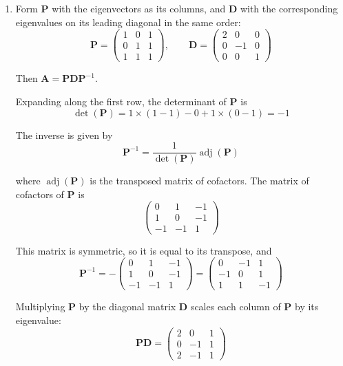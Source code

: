\documentclass[leqno]{article}
\begin{document}
\begin{enumerate}[
  label=\textbf{\arabic*.},
  leftmargin=*,
  topsep=0pt,
  partopsep=0pt,
  parsep=0pt
]
\vspace*{10pt}

\begin{djsSolution}
\begin{enumerate}[label=\textbf{(\alph*)}, start=1]
  \item Form \(\mathbf{P}\) with the eigenvectors as its columns, and \(\mathbf{D}\) with the corresponding eigenvalues on its leading diagonal in the same order:
\[
\mathbf{P}=\begin{pmatrix} 1 & 0 & 1 \\ 0 & 1 & 1 \\ 1 & 1 & 1 \end{pmatrix},\qquad \mathbf{D}=\begin{pmatrix} 2 & 0 & 0 \\ 0 & -1 & 0 \\ 0 & 0 & 1 \end{pmatrix}
\]

Then \(\mathbf{A}=\mathbf{P}\mathbf{D}\mathbf{P}^{-1}\).

Expanding along the first row, the determinant of \(\mathbf{P}\) is
\[
\det(\mathbf{P})=1\times(1-1)-0+1\times(0-1)=-1
\]

The inverse is given by
\[
\mathbf{P}^{-1}=\frac{1}{\det(\mathbf{P})}\operatorname{adj}(\mathbf{P})
\]

where \(\operatorname{adj}(\mathbf{P})\) is the transposed matrix of cofactors. The matrix of cofactors of \(\mathbf{P}\) is
\[
\begin{pmatrix} 0 & 1 & -1 \\ 1 & 0 & -1 \\ -1 & -1 & 1 \end{pmatrix}
\]

This matrix is symmetric, so it is equal to its transpose, and
\[
\mathbf{P}^{-1}=-\begin{pmatrix} 0 & 1 & -1 \\ 1 & 0 & -1 \\ -1 & -1 & 1 \end{pmatrix}=\begin{pmatrix} 0 & -1 & 1 \\ -1 & 0 & 1 \\ 1 & 1 & -1 \end{pmatrix}
\]

Multiplying \(\mathbf{P}\) by the diagonal matrix \(\mathbf{D}\) scales each column of \(\mathbf{P}\) by its eigenvalue:
\[
\mathbf{P}\mathbf{D}=\begin{pmatrix} 2 & 0 & 1 \\ 0 & -1 & 1 \\ 2 & -1 & 1 \end{pmatrix}
\]


\end{enumerate}
\end{djsSolution}
\end{enumerate}
\end{document}
